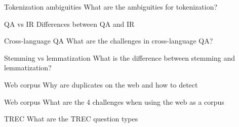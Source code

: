 \documentclass{article}
\begin{document}
\begin{exercise}{Tokenization ambiguities}
  What are the ambiguities for tokenization?

  \begin{solution}
  \end{solution}
\end{exercise}

\begin{exercise}{QA vs IR}
  Differences between QA and IR

  \begin{solution}
  \end{solution}
\end{exercise}

\begin{exercise}{Cross-language QA}
  What are the challenges in cross-language QA?

  \begin{solution}
  \end{solution}
\end{exercise}

\begin{exercise}{Stemming vs lemmatization}
  What is the difference between stemming and lemmatization?

  \begin{solution}
  \end{solution}
\end{exercise}

\begin{exercise}{Web corpus}
  Why are duplicates on the web and how to detect

  \begin{solution}
  \end{solution}
\end{exercise}

\begin{exercise}{Web corpus}
  What are the 4 challenges when using the web as a corpus

  \begin{solution}
  \end{solution}
\end{exercise}

\begin{exercise}{TREC}
  What are the TREC question types

  \begin{solution}
  \end{solution}
\end{exercise}
\end{document}
